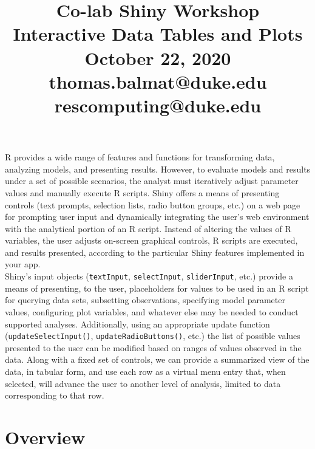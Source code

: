 \documentclass[10pt, letterpaper]{article}
\title{\Large Co-lab Shiny Workshop\\[6pt]
       \large Interactive Data Tables and Plots\\[6pt]
       October 22, 2020\\[20pt]
       \normalsize thomas.balmat@duke.edu\\[1pt]rescomputing@duke.edu}
\date{}
\begin{document}
    
\begin{spacing}{1.0}
    
\maketitle

\vspace{-20pt}


R provides a wide range of features and functions for transforming data, analyzing models, and presenting results.  However, to evaluate models and results under a set of possible scenarios, the analyst must iteratively adjust parameter values and manually execute R scripts.  Shiny offers a means of presenting controls (text prompts, selection lists, radio button groups, etc.) on a web page for prompting user input and dynamically integrating the user's web environment with the analytical portion of an R script.  Instead of altering the values of R variables, the user adjusts on-screen graphical controls, R scripts are executed, and results presented, according to the particular Shiny features implemented in your app.\\

Shiny's input objects (\texttt{textInput}, \texttt{selectInput}, \texttt{sliderInput}, etc.) provide a means of presenting, to the user, placeholders for values to be used in an R script for querying data sets, subsetting observations, specifying model parameter values, configuring plot variables, and whatever else may be needed to conduct supported analyses.  Additionally, using an appropriate update function (\texttt{updateSelectInput()}, \texttt{updateRadioButtons()}, etc.) the list of possible values presented to the user can be modified based on ranges of values observed in the data.  Along with a fixed set of controls, we can provide a summarized view of the data, in tabular form, and use each row as a virtual menu entry that, when selected, will advance the user to another level of analysis, limited to data corresponding to that row.



\section{Overview}


\end{spacing}
\end{document}
